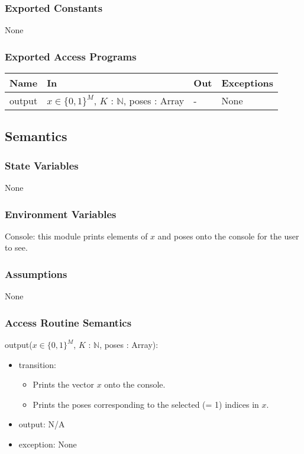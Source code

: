 \documentclass[12pt, titlepage]{article}
\begin{document}
\subsubsection{Exported Constants}
None 

\subsubsection{Exported Access Programs}
\begin{center}
\begin{tabular}{p{3cm} p{4cm} p{4cm} p{3cm}}
\hline
\textbf{Name} & \textbf{In} & \textbf{Out} & \textbf{Exceptions} \\
\hline
output & $x \in \{0,1\}^M$, $K$ : $\mathbb{N}$, poses : Array  & - & None \\
\hline
\end{tabular}
\end{center}

\subsection{Semantics}

\subsubsection{State Variables}
None

\subsubsection{Environment Variables}
Console: this module prints elements of $x$ and poses onto the console for the user to see.

\subsubsection{Assumptions}
None

\subsubsection{Access Routine Semantics}

\noindent output($x \in \{0,1\}^M$, $K$ : $\mathbb{N}$, poses : Array):
\begin{itemize}
\item transition: 
\begin{itemize}
  \item Prints the vector $x$ onto the console. 
  \item Prints the poses corresponding to the selected (= 1) indices in $x$. 
\end{itemize}
\item output: N/A 
\item exception: None
\end{itemize}
\end{document}
